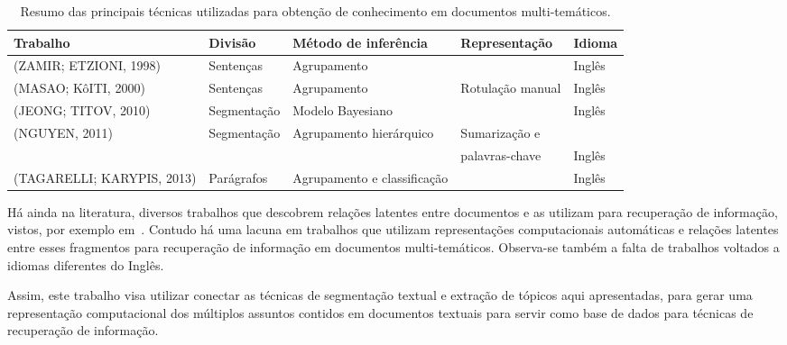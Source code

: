 \begin{table}[!h]
	\centering \tiny 
	\begin{tabular}{|l|l|l|l|l|} \hline
		\textbf{Trabalho} & \textbf{Divisão} & \textbf{Método de inferência}  & \textbf{Representação} & \textbf{Idioma}\\
		\hline\hline 
	
	 (ZAMIR; ETZIONI, 1998) &      	Sentenças  & Agrupamento                 & & Inglês \\ \hline
	 (MASAO; KôITI, 2000) &        	Sentenças  & Agrupamento                 & Rotulação  manual & Inglês \\ \hline
	 (JEONG; TITOV, 2010) &        	Segmentação   & Modelo Bayesiano            & & Inglês \\ \hline
	 (NGUYEN, 2011) &              	Segmentação  & Agrupamento hierárquico     & Sumarização e & \\ &&&palavras-chave& Inglês  \\ \hline
	 (TAGARELLI; KARYPIS, 2013) &  	Parágrafos & Agrupamento e classificação & & Inglês \\ \hline

	\end{tabular}
	\caption{Resumo das principais técnicas utilizadas para obtenção de conhecimento em documentos multi-temáticos.}
	\label{tab:resumo-trabalhos}

\end{table}


Há ainda na literatura, diversos trabalhos que descobrem relações latentes entre documentos e as utilizam para recuperação de informação, vistos, por exemplo em~\cite{Corcoglioniti2016, Jian2016, habibi2015, LiJiang2014, Rezende2011}. Contudo há uma lacuna em trabalhos que utilizam representações computacionais automáticas e relações latentes entre esses fragmentos para recuperação de informação em documentos multi-temáticos. Observa-se também a falta de trabalhos voltados a idiomas diferentes do Inglês.

Assim, este trabalho visa utilizar conectar as técnicas de segmentação textual e extração de tópicos aqui apresentadas, para gerar uma representação computacional dos múltiplos assuntos contidos em documentos textuais para servir como base de dados para técnicas de recuperação de informação.





















